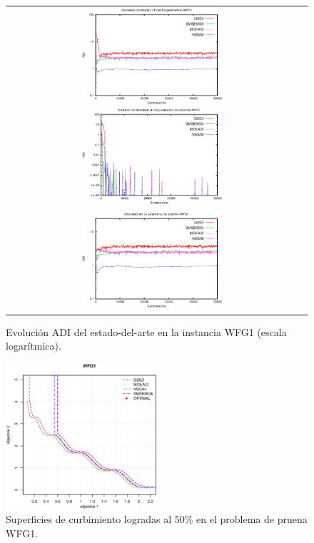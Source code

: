 \begin{figure}[H]
\centering
\begin{tabular}{cc}
    \includegraphics[width=0.5\textwidth]{Figures_Chapter1/Average_FullParamsStateArt.eps} 
    \includegraphics[width=0.5\textwidth]{Figures_Chapter1/Average_DistanceParamsStateArt.eps}  \\
    \includegraphics[width=0.5\textwidth]{Figures_Chapter1/Average_PositionParamsStateArt.eps}  
\end{tabular}
\caption{Evolución ADI del estado-del-arte en la instancia WFG1 (escala logarítmica).}
\label{fig:Average_StateArtDiversityDistanceParameters}
\end{figure}

\begin{figure}[H]
\centering
    \includegraphics[width=0.5\textwidth]{Figures_Chapter1/WFG1.eps}  
\caption{Superficies de curbimiento logradas al 50\% en el problema de pruena WFG1.}
\label{fig:Superficie_WFG1}
\end{figure}




